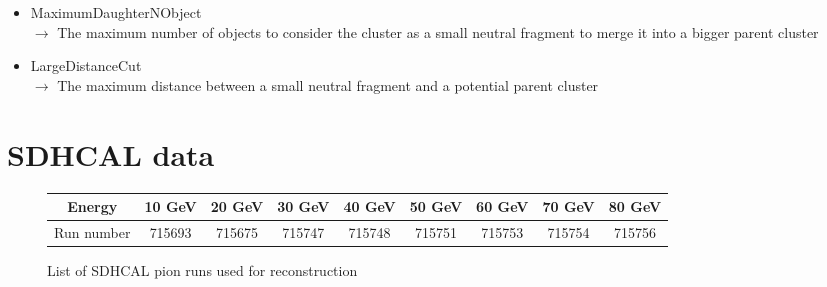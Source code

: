 \documentclass[cits]{JINST}
\begin{document}
\begin{itemize}
  \item MaximumDaughterNObject \\
  $\rightarrow$ The maximum number of objects to consider the cluster as a small neutral fragment to merge it into a bigger parent cluster
  \item LargeDistanceCut \\
  $\rightarrow$ The maximum distance between a small neutral fragment and a potential parent cluster
\end{itemize}



\newpage
\section{SDHCAL data}

\begin{center}
  \begin{figure}[!h]
    \begin{tabular}{| c | c | c | c | c | c | c | c | c |}
      \hline
      Energy & 10 GeV & 20 GeV & 30 GeV & 40 GeV & 50 GeV & 60 GeV & 70 GeV & 80 GeV \\ \hline
      Run number & 715693 & 715675 & 715747 & 715748 & 715751 & 715753 & 715754 & 715756 \\ \hline
    \end{tabular}
    \caption{\label{SDHCAL_RUN_LIST} List of SDHCAL pion runs used for reconstruction}
  \end{figure}
\end{center}
\end{document}

